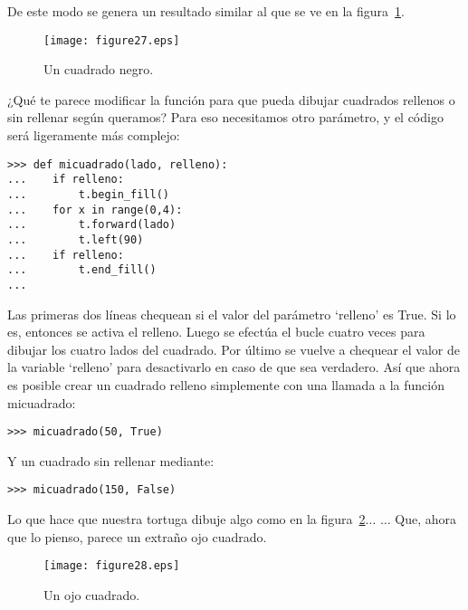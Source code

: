 \noindent
De este modo se genera un resultado similar al que se ve en la figura~\ref{fig27}.

\begin{figure}
\begin{center}
\texttt{[image: figure27.eps]}
\end{center}
\caption{Un cuadrado negro.}\label{fig27}
\end{figure}

¿Qué te parece modificar la función para que pueda dibujar cuadrados rellenos o sin rellenar según queramos?  Para eso necesitamos otro parámetro, y el código será ligeramente más complejo:

\begin{listing}
\begin{verbatim}
>>> def micuadrado(lado, relleno):
...    if relleno:
...        t.begin_fill()
...    for x in range(0,4):
...        t.forward(lado)
...        t.left(90)
...    if relleno:
...        t.end_fill()
...
\end{verbatim}
\end{listing}

Las primeras dos líneas chequean si el valor del parámetro `relleno' es True. Si lo es, entonces se activa el relleno.  Luego se efectúa el bucle cuatro veces para dibujar los cuatro lados del cuadrado. Por último se vuelve a chequear el valor de la variable `relleno' para desactivarlo en caso de que sea verdadero.  Así que ahora es posible crear un  cuadrado relleno simplemente con una llamada a la función micuadrado:

\begin{listing}
\begin{verbatim}
>>> micuadrado(50, True)
\end{verbatim}
\end{listing}

\noindent
Y un cuadrado sin rellenar mediante:

\begin{listing}
\begin{verbatim}
>>> micuadrado(150, False)
\end{verbatim}
\end{listing}

\noindent
Lo que hace que nuestra tortuga dibuje algo como en la figura~\ref{fig28}$\ldots$ $\ldots$ Que, ahora que lo pienso, parece un extraño ojo cuadrado.

\begin{figure}
\begin{center}
\texttt{[image: figure28.eps]}
\end{center}
\caption{Un ojo cuadrado.}\label{fig28}
\end{figure}

